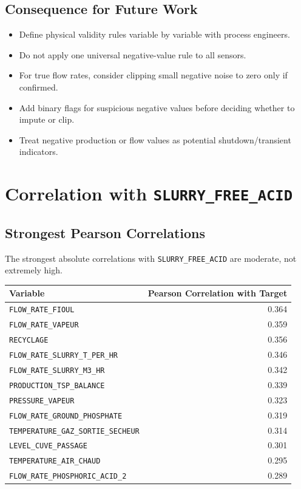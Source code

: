 \documentclass[11pt,a4paper]{article}
\begin{document}
\subsection{Consequence for Future Work}

\begin{itemize}
    \item Define physical validity rules variable by variable with process engineers.
    \item Do not apply one universal negative-value rule to all sensors.
    \item For true flow rates, consider clipping small negative noise to zero only if confirmed.
    \item Add binary flags for suspicious negative values before deciding whether to impute or clip.
    \item Treat negative production or flow values as potential shutdown/transient indicators.
\end{itemize}

\section{Correlation with \texttt{SLURRY\_FREE\_ACID}}

\subsection{Strongest Pearson Correlations}

The strongest absolute correlations with \texttt{SLURRY\_FREE\_ACID} are moderate, not extremely high.

\begin{longtable}{p{8cm}r}
\toprule
Variable & Pearson Correlation with Target \\
\midrule
\texttt{FLOW\_RATE\_FIOUL} & 0.364 \\
\texttt{FLOW\_RATE\_VAPEUR} & 0.359 \\
\texttt{RECYCLAGE} & 0.356 \\
\texttt{FLOW\_RATE\_SLURRY\_T\_PER\_HR} & 0.346 \\
\texttt{FLOW\_RATE\_SLURRY\_M3\_HR} & 0.342 \\
\texttt{PRODUCTION\_TSP\_BALANCE} & 0.339 \\
\texttt{PRESSURE\_VAPEUR} & 0.323 \\
\texttt{FLOW\_RATE\_GROUND\_PHOSPHATE} & 0.319 \\
\texttt{TEMPERATURE\_GAZ\_SORTIE\_SECHEUR} & 0.314 \\
\texttt{LEVEL\_CUVE\_PASSAGE} & 0.301 \\
\texttt{TEMPERATURE\_AIR\_CHAUD} & 0.295 \\
\texttt{FLOW\_RATE\_PHOSPHORIC\_ACID\_2} & 0.289 \\
\bottomrule
\end{longtable}
\end{document}
